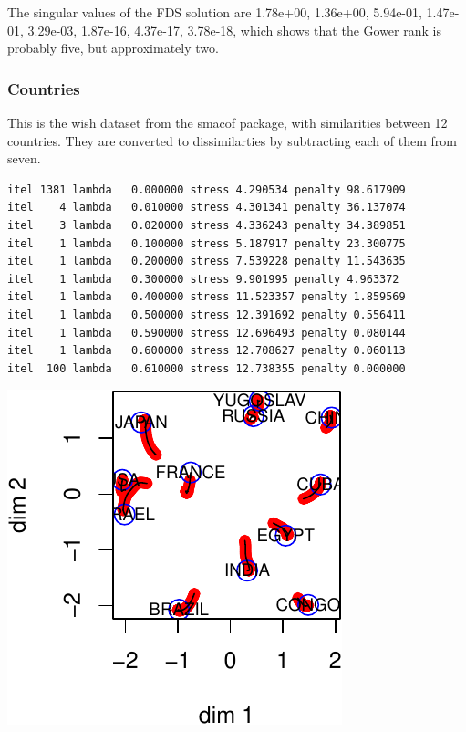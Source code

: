 \documentclass[
  12pt,
  letterpaper,
  DIV=11,
  numbers=noendperiod]{scrreprt}
\theoremstyle{remark}
\begin{document}
The singular values of the FDS solution are 1.78e+00, 1.36e+00,
5.94e-01, 1.47e-01, 3.29e-03, 1.87e-16, 4.37e-17, 3.78e-18, which shows
that the Gower rank is probably five, but approximately two.

\subsubsection{Countries}\label{countries}

This is the wish dataset from the smacof package, with similarities
between 12 countries. They are converted to dissimilarties by
subtracting each of them from seven.

\begin{verbatim}
itel 1381 lambda   0.000000 stress 4.290534 penalty 98.617909 
itel    4 lambda   0.010000 stress 4.301341 penalty 36.137074 
itel    3 lambda   0.020000 stress 4.336243 penalty 34.389851 
itel    1 lambda   0.100000 stress 5.187917 penalty 23.300775 
itel    1 lambda   0.200000 stress 7.539228 penalty 11.543635 
itel    1 lambda   0.300000 stress 9.901995 penalty 4.963372 
itel    1 lambda   0.400000 stress 11.523357 penalty 1.859569 
itel    1 lambda   0.500000 stress 12.391692 penalty 0.556411 
itel    1 lambda   0.590000 stress 12.696493 penalty 0.080144 
itel    1 lambda   0.600000 stress 12.708627 penalty 0.060113 
itel  100 lambda   0.610000 stress 12.738355 penalty 0.000000 
\end{verbatim}

\begin{center}
\includegraphics{global_files/figure-pdf/countries-1.pdf}
\end{center}
\end{document}
